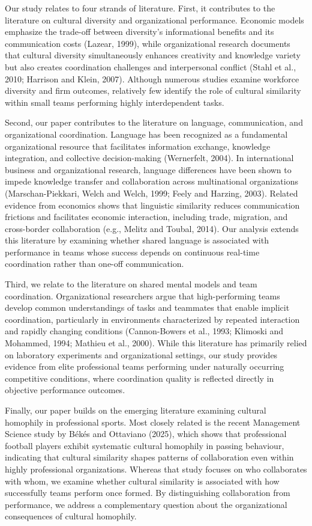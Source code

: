 \documentclass[10pt]{article}
\begin{document}
Our study relates to four strands of literature. First, it contributes to the literature on cultural diversity and organizational performance. Economic models emphasize the trade-off between diversity's informational benefits and its communication costs (Lazear, 1999), while organizational research documents that cultural diversity simultaneously enhances creativity and knowledge variety but also creates coordination challenges and interpersonal conflict (Stahl et al., 2010; Harrison and Klein, 2007). Although numerous studies examine workforce diversity and firm outcomes, relatively few identify the role of cultural similarity within small teams performing highly interdependent tasks.

Second, our paper contributes to the literature on language, communication, and organizational coordination. Language has been recognized as a fundamental organizational resource that facilitates information exchange, knowledge integration, and collective decision-making (Wernerfelt, 2004). In international business and organizational research, language differences have been shown to impede knowledge transfer and collaboration across multinational organizations (Marschan-Piekkari, Welch and Welch, 1999; Feely and Harzing, 2003). Related evidence from economics shows that linguistic similarity reduces communication frictions and facilitates economic interaction, including trade, migration, and cross-border collaboration (e.g., Melitz and Toubal, 2014). Our analysis extends this literature by examining whether shared language is associated with performance in teams whose success depends on continuous real-time coordination rather than one-off communication.

Third, we relate to the literature on shared mental models and team coordination. Organizational researchers argue that high-performing teams develop common understandings of tasks and teammates that enable implicit coordination, particularly in environments characterized by repeated interaction and rapidly changing conditions (Cannon-Bowers et al., 1993; Klimoski and Mohammed, 1994; Mathieu et al., 2000). While this literature has primarily relied on laboratory experiments and organizational settings, our study provides evidence from elite professional teams performing under naturally occurring competitive conditions, where coordination quality is reflected directly in objective performance outcomes.

Finally, our paper builds on the emerging literature examining cultural homophily in professional sports. Most closely related is the recent Management Science study by Békés and Ottaviano (2025), which shows that professional football players exhibit systematic cultural homophily in passing behaviour, indicating that cultural similarity shapes patterns of collaboration even within highly professional organizations. Whereas that study focuses on who collaborates with whom, we examine whether cultural similarity is associated with how successfully teams perform once formed. By distinguishing collaboration from performance, we address a complementary question about the organizational consequences of cultural homophily.
\end{document}

